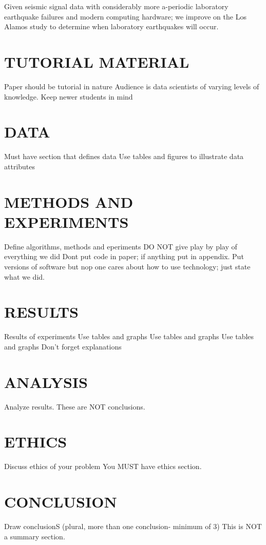 \documentclass[]{llncs}
\begin{document}
Given seismic signal data with considerably more a-periodic laboratory earthquake failures and modern computing hardware; we improve on the Los Alamos study\cite{Bertrand} to determine when laboratory earthquakes will occur.





\section{TUTORIAL MATERIAL}
Paper should be tutorial in nature
Audience is data scientists of varying levels of knowledge. Keep newer students in mind
\section{DATA}
Must have section that defines data
Use tables and figures to illustrate data attributes
\section{METHODS AND EXPERIMENTS}
Define algorithms, methods and eperiments
DO NOT give play by play of everything we did
Dont put code in paper; if anything put in appendix.
Put versions of software but nop one cares about how to use technology; just state what we did.
\section{RESULTS}
Results of experiments
Use tables and graphs
Use tables and graphs
Use tables and graphs
Don't forget explanations
\section{ANALYSIS}
Analyze results.
These are NOT conclusions.
\section{ETHICS}
Discuss ethics of your problem
You MUST have ethics section.
\section{CONCLUSION}
Draw conclusionS (plural, more than one conclusion- minimum of 3)
This is NOT a summary section.


\end{document}
